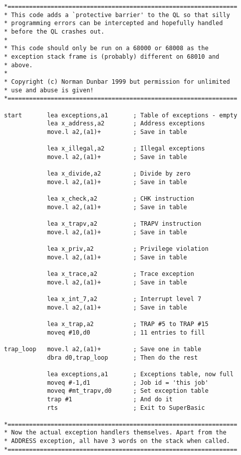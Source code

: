 \begin{lstlisting}[firstnumber=1,caption={Exception Handler for the QL},label={lst:ExceptionHandlerQL}]
*================================================================
* This code adds a `protective barrier' to the QL so that silly 
* programming errors can be intercepted and hopefully handled 
* before the QL crashes out.
*
* This code should only be run on a 68000 or 68008 as the 
* exception stack frame is (probably) different on 68010 and 
* above.
*
* Copyright (c) Norman Dunbar 1999 but permission for unlimited 
* use and abuse is given!
*================================================================

start       lea exceptions,a1       ; Table of exceptions - empty
            lea x_address,a2        ; Address exceptions
            move.l a2,(a1)+         ; Save in table

            lea x_illegal,a2        ; Illegal exceptions
            move.l a2,(a1)+         ; Save in table

            lea x_divide,a2         ; Divide by zero
            move.l a2,(a1)+         ; Save in table

            lea x_check,a2          ; CHK instruction
            move.l a2,(a1)+         ; Save in table

            lea x_trapv,a2          ; TRAPV instruction
            move.l a2,(a1)+         ; Save in table

            lea x_priv,a2           ; Privilege violation
            move.l a2,(a1)+         ; Save in table

            lea x_trace,a2          ; Trace exception
            move.l a2,(a1)+         ; Save in table

            lea x_int_7,a2          ; Interrupt level 7
            move.l a2,(a1)+         ; Save in table

            lea x_trap,a2           ; TRAP #5 to TRAP #15
            moveq #10,d0            ; 11 entries to fill

trap_loop   move.l a2,(a1)+         ; Save one in table
            dbra d0,trap_loop       ; Then do the rest

            lea exceptions,a1       ; Exceptions table, now full
            moveq #-1,d1            ; Job id = 'this job'
            moveq #mt_trapv,d0      ; Set exception table
            trap #1                 ; And do it
            rts                     ; Exit to SuperBasic

*================================================================
* Now the actual exception handlers themselves. Apart from the 
* ADDRESS exception, all have 3 words on the stack when called. 
*================================================================


\end{lstlisting}
